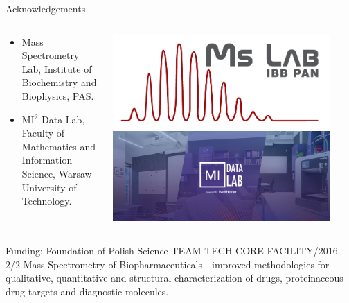 \documentclass{beamer}\usepackage[]{graphicx}\usepackage[]{color}
\begin{document}
\begin{frame}{Acknowledgements}


\begin{columns}
\begin{column}{0.5\textwidth}
   \begin{itemize}
   \item Mass Spectrometry Lab, Institute of Biochemistry and Biophysics, PAS.
   \item MI$^2$ Data Lab, Faculty of Mathematics and Information Science, Warsaw University of Technology.
   \end{itemize}
\end{column}
\begin{column}{0.5\textwidth}  %
    \begin{center}
    \includegraphics[width=0.9\textwidth]{static_figure/ibb_logo.png}
     \includegraphics[width=0.9\textwidth]{static_figure/mi2.png}
     \end{center}
\end{column}
\end{columns}

\medskip 

\small Funding: Foundation of Polish Science TEAM TECH CORE FACILITY/2016-2/2 Mass Spectrometry of Biopharmaceuticals - improved methodologies for qualitative, quantitative and structural characterization of drugs, proteinaceous drug targets and diagnostic molecules.

\end{frame}
\end{document}
